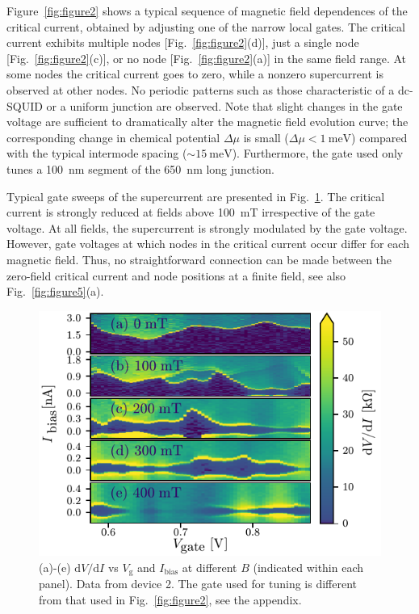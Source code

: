 Figure~\ref{fig:figure2} shows a typical sequence of magnetic field dependences of the critical current, obtained by adjusting one of the narrow local gates.
The critical current exhibits multiple nodes [Fig.~\ref{fig:figure2}(d)], just a single node [Fig.~\ref{fig:figure2}(c)], or no node [Fig.~\ref{fig:figure2}(a)] in the same field range.
At some nodes the critical current goes to zero, while a nonzero supercurrent is observed at other nodes.
No periodic patterns such as those characteristic of a dc-SQUID or a uniform junction are observed.
Note that slight changes in the gate voltage are sufficient to dramatically alter the magnetic field evolution curve; the corresponding change in chemical potential $\Delta \mu$ is small ($\Delta \mu < \SI{1}{\milli \electronvolt}$) compared with the typical intermode spacing ($\sim \SI{15}{\milli \electronvolt}$).
Furthermore, the gate used only tunes a \SI{100}{\nano \meter} segment of the \SI{650}{\nano \meter} long junction.

Typical gate sweeps of the supercurrent are presented in Fig.~\ref{fig:figure3}.
The critical current is strongly reduced at fields above \SI{100}{\milli \tesla} irrespective of the gate voltage.
At all fields, the supercurrent is strongly modulated by the gate voltage.
However, gate voltages at which nodes in the critical current occur differ for each magnetic field.
Thus, no straightforward connection can be made between the zero-field critical current and node positions at a finite field, see also Fig.~\ref{fig:figure5}(a).

\begin{figure}
\includegraphics[width=\columnwidth]{chapter_supercurrent/figures/fig3.pdf}
\caption{(a)-(e) $\mathrm{d}V/\mathrm{d}I$ vs $V_\mathrm{g}$ and $I_\mathrm{bias}$ at different $B$ (indicated within each panel). Data from device 2. The gate used for tuning is different from that used in Fig.~\ref{fig:figure2}, see the appendix. }
\label{fig:figure3}
\end{figure}

